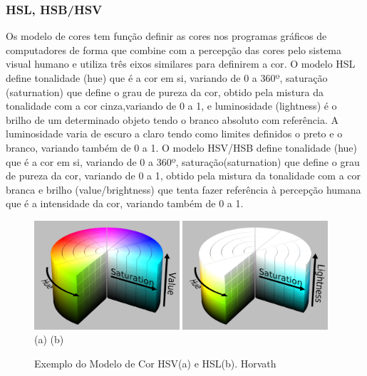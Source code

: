\subsubsection{HSL, HSB/HSV}
Os modelo de cores tem função definir as cores nos programas gráficos de computadores de forma que combine com a 
percepção das cores pelo sistema visual humano e utiliza três eixos similares para definirem a cor\cite{Leao:2005}.
O modelo HSL define tonalidade (hue) que é a cor em si, variando de 0 a 360º, saturação (saturnation) que define o grau de pureza da cor, obtido pela mistura da tonalidade com a cor cinza,variando de 0 a 1, e luminosidade (lightness) é o brilho de um determinado objeto tendo o branco absoluto com referência. A luminosidade varia de escuro a claro tendo como limites definidos o preto e o branco\cite{Leao:2005}, variando também de 0 a 1.
O modelo HSV/HSB define tonalidade (hue) que é a cor em si, variando de 0 a 360º, saturação(saturnation) que define o grau de pureza da cor, variando de 0 a 1, obtido pela mistura da tonalidade com a cor branca e brilho (value/brightness) que tenta fazer referência à percepção humana\cite{Leao:2005} que é a intensidade da cor, variando também de 0 a 1.
\begin{figure}[!h]
	\centering
	\includegraphics[width=0.48\textwidth]{hsv.pdf}
	\includegraphics[width=0.48\textwidth]{HSL.pdf} \\
	(a) \hspace{10cm} (b)
	\caption{Exemplo do Modelo de Cor HSV(a) e HSL(b). Horvath\cite{ImagensHSLHSVRGB}}
	\label{ModeloHSV}
\end{figure} 
